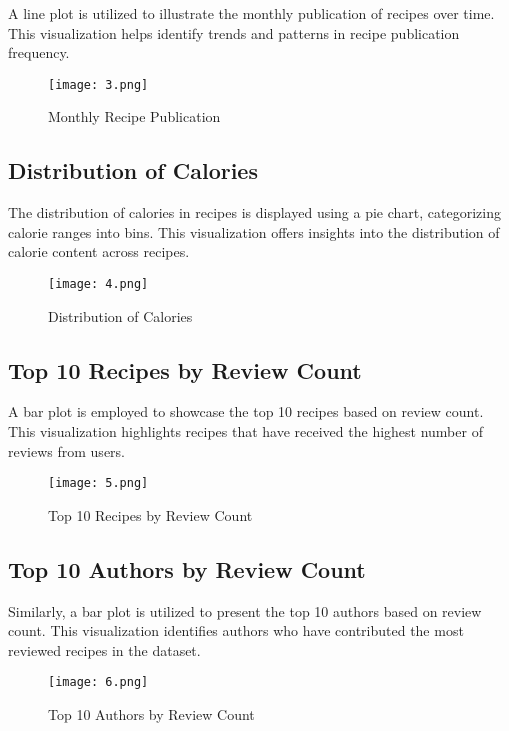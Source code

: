 \documentclass[conference]{IEEEtran}
\begin{document}
A line plot is utilized to illustrate the monthly publication of recipes over time. This visualization helps identify trends and patterns in recipe publication frequency.

\begin{figure}[H]
\centering
\texttt{[image: 3.png]}
\caption{Monthly Recipe Publication}
\label{fig:monthly_publication}
\end{figure}

\subsection{Distribution of Calories}

The distribution of calories in recipes is displayed using a pie chart, categorizing calorie ranges into bins. This visualization offers insights into the distribution of calorie content across recipes.

\begin{figure}[H]
\centering
\texttt{[image: 4.png]}
\caption{Distribution of Calories}
\label{fig:distribution_calories}
\end{figure}

\subsection{Top 10 Recipes by Review Count}

A bar plot is employed to showcase the top 10 recipes based on review count. This visualization highlights recipes that have received the highest number of reviews from users.

\begin{figure}[H]
\centering
\texttt{[image: 5.png]}
\caption{Top 10 Recipes by Review Count}
\label{fig:top10_recipes}
\end{figure}

\subsection{Top 10 Authors by Review Count}

Similarly, a bar plot is utilized to present the top 10 authors based on review count. This visualization identifies authors who have contributed the most reviewed recipes in the dataset.

\begin{figure}[H]
\centering
\texttt{[image: 6.png]}
\caption{Top 10 Authors by Review Count}
\label{fig:top10_authors}
\end{figure}
\end{document}
